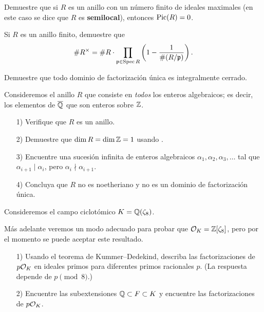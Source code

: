\begin{ejercicio}
  Demuestre que si $R$ es un anillo con un número finito de ideales maximales
  (en este caso se dice que $R$ es \textbf{semilocal}), entonces $\operatorname{Pic} (R) = 0$.
\end{ejercicio}

\begin{ejercicio}
  Si $R$ es un anillo finito, demuestre que
  \[ \# R^\times = \# R \cdot \prod_{\mathfrak{p} \in \operatorname{Spec} R}
                    \left(1 - \frac{1}{\# (R/\mathfrak{p})}\right). \]
\end{ejercicio}

\begin{ejercicio}
  Demuestre que todo dominio de factorización única es integralmente cerrado.
\end{ejercicio}

\begin{ejercicio}
  \label{ejerc:todos-enteros-algebraicos}
  Consideremos el anillo $R$ que consiste en \emph{todos} los enteros
  algebraicos; es decir, los elementos de $\overline{\mathbb{Q}}$ que son enteros sobre
  $\mathbb{Z}$.

  \begin{enumerate}
  \item[1)] Verifique que $R$ es un anillo.

  \item[2)] Demuestre que $\dim R = \dim \mathbb{Z} = 1$ usando
    \cite[Theorem 5.11]{Atiyah-Macdonald}.

  \item[3)] Encuentre una sucesión infinita de enteros algebraicos
    $\alpha_1, \alpha_2, \alpha_3, \ldots$ tal que $\alpha_{i+1}\mid\alpha_i$,
    pero $\alpha_i \nmid \alpha_{i+1}$.

  \item[4)] Concluya que $R$ no es noetheriano y no es un dominio de
    factorización única.
  \end{enumerate}
\end{ejercicio}

\begin{ejercicio}
  Consideremos el campo ciclotómico $K = \mathbb{Q} (\zeta_8)$.

  Más adelante veremos un modo adecuado para probar que
  $\mathcal{O}_K = \mathbb{Z}[\zeta_8]$, pero por el momento se puede aceptar este resultado.

  \begin{enumerate}
  \item[1)] Usando el teorema de Kummer--Dedekind, describa las factorizaciones de
    $p \mathcal{O}_K$ en ideales primos para diferentes primos racionales $p$.
    (La respuesta depende de $p \pmod{8}$.)

  \item[2)] Encuentre las subextensiones $\mathbb{Q} \subset F \subset K$ y encuentre
    las factorizaciones de $p \mathcal{O}_K$.
  \end{enumerate}
\end{ejercicio}

